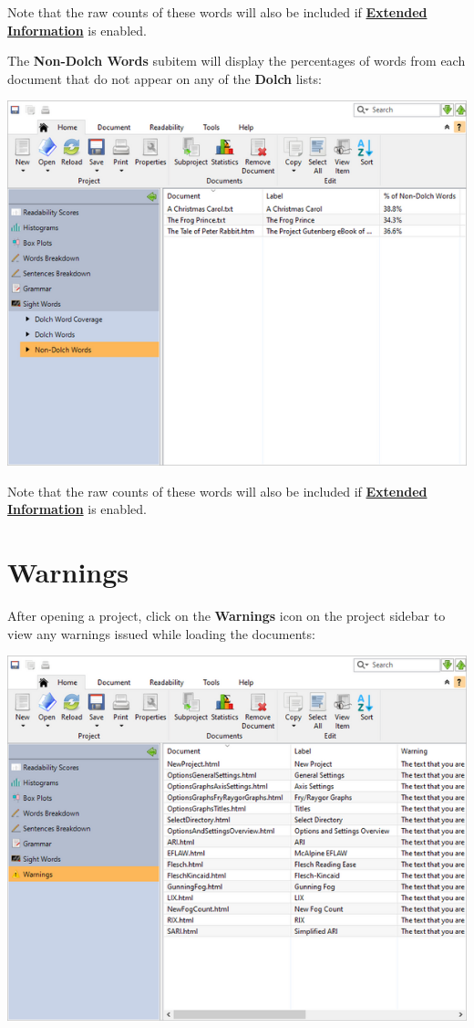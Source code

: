 \documentclass[
]{book}
\theoremstyle{definition}
\theoremstyle{definition}
\theoremstyle{definition}
\theoremstyle{definition}
\theoremstyle{remark}
\begin{document}
Note that the raw counts of these words will also be included if \protect\hyperlink{options-summary-report}{\textbf{Extended Information}} is enabled.

The \textbf{Non-Dolch Words} subitem will display the percentages of words from each document that do not appear on any of the \textbf{Dolch} lists:

\includegraphics{Images/batchdolchnonwords.png}

Note that the raw counts of these words will also be included if \protect\hyperlink{options-summary-report}{\textbf{Extended Information}} is enabled.

\hypertarget{reviewing-batch-warnings}{%
\section{Warnings}\label{reviewing-batch-warnings}}

After opening a project, click on the \textbf{Warnings} icon on the project sidebar to view any warnings issued while loading the documents:

\includegraphics{Images/Warnings.png}
\end{document}
